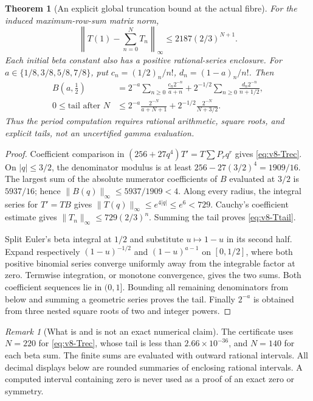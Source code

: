 \documentclass[11pt]{article}
\newtheorem{theorem}{Theorem}[section]
\theoremstyle{definition}
\theoremstyle{remark}
\newtheorem{remark}[remark]{Remark}
\begin{document}
\begin{theorem}[An explicit global truncation bound at the actual fibre]
\label{thm:v8-period-tail}
For the induced maximum-row-sum matrix norm,
\begin{equation}
 \boxed{\left\|T(1)-\sum_{n=0}^{N}T_n\right\|_\infty
 \le2187(2/3)^{N+1}.}
 \label{eq:v8-Ttail}
\end{equation}
Each initial beta constant also has a positive rational-series enclosure.
For $a\in\{1/8,3/8,5/8,7/8\}$, put
$c_n=(1/2)_n/n!$, $d_n=(1-a)_n/n!$. Then
\begin{align}
 B(a,\tfrac12)&=2^{-a}\sum_{n\ge0}\frac{c_n2^{-n}}{a+n}
  +2^{-1/2}\sum_{n\ge0}\frac{d_n2^{-n}}{n+1/2},\\
 0\le\text{tail after }N
 &\le 2^{-a}\frac{2^{-N}}{a+N+1}
       +2^{-1/2}\frac{2^{-N}}{N+3/2}.
 \label{eq:v8-beta-tail}
\end{align}
Thus the period computation requires rational arithmetic, square roots,
and explicit tails, not an uncertified gamma evaluation.
\end{theorem}
\begin{proof}
Coefficient comparison in $ (256+27q^4)T'=T\sum P_rq^r$ gives
\eqref{eq:v8-Trec}. On $|q|\le3/2$, the denominator modulus is at least
$256-27(3/2)^4=1909/16$. The largest sum of the absolute numerator
coefficients of $B$ evaluated at $3/2$ is $5937/16$; hence
$\|B(q)\|_\infty\le5937/1909<4$. Along every radius, the integral
series for $T'=TB$ gives $\|T(q)\|_\infty\le e^{4|q|}\le e^6<729$.
Cauchy's coefficient estimate gives
$\|T_n\|_\infty\le729(2/3)^n$. Summing the tail proves
\eqref{eq:v8-Ttail}.

Split Euler's beta integral at $1/2$ and substitute $u\mapsto1-u$ in
its second half. Expand respectively $(1-u)^{-1/2}$ and
$(1-u)^{a-1}$ on $[0,1/2]$, where both positive binomial series converge
uniformly away from the integrable factor at zero. Termwise integration,
or monotone convergence, gives the two sums. Both coefficient sequences
lie in $(0,1]$. Bounding all remaining denominators from below and summing
a geometric series proves the tail. Finally $2^{-a}$ is obtained from
three nested square roots of two and integer powers.
\end{proof}

\begin{remark}[What is and is not an exact numerical claim]
The certificate uses $N=220$ for \eqref{eq:v8-Trec}, whose tail is less
than $2.66\times10^{-36}$, and $N=140$ for each beta sum. The finite sums
are evaluated with outward rational intervals. All decimal displays below
are rounded summaries of enclosing rational intervals. A computed interval
containing zero is never used as a proof of an exact zero or symmetry.
\end{remark}
\end{document}
